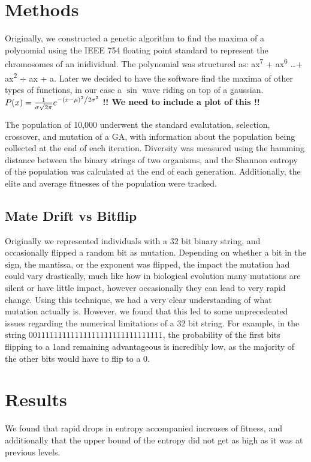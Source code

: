 \documentclass[11pt]{article}
\begin{document}
\section{Methods}
\label{sec:org2c55902}
Originally, we constructed a genetic algorithm to find the maxima of a
polynomial using the IEEE 754 floating point standard to represent the
chromosomes of an inidividual. The polynomial was structured as: ax\textsuperscript{7}
+ ax\textsuperscript{6} \ldots + ax\textsuperscript{2} + ax + a. Later we
decided to have the software find the maxima of other types of functions,
in our case a $\sin$ wave riding on top of a gaussian. $ P(x) = \frac{1}{{\sigma \sqrt {2\pi } }} e^{{{ - \left( {x - \mu} \right)^2 } \mathord{\left/ {\vphantom {{ - \left( {x - \mu } \right)^2 } {2\sigma ^2 }}} \right. \kern-\nulldelimiterspace} {2\sigma ^2 }}} $
\color{red} \textbf{!! We need to include a plot of this !!}
\color{black}

The population of 10,000 underwent the standard evalutation, selection,
crossover, and mutation of a  GA, with information about the population
being collected at the end of each iteration. Diversity was measured using
the hamming distance between the binary strings of two organisms, and the
Shannon entropy of the population was calculated at the end of each generation.
Additionally, the elite and average fitnesses of the population were tracked.

\subsection{Mate Drift vs Bitflip}
Originally we represented individuals with a 32 bit binary string, and occasionally 
flipped a random bit as mutation. Depending on whether a bit in the sign, the mantissa, 
or the exponent was flipped, the impact the mutation had could vary drastically,
much like how in biological evolution many mutations are silent or have little impact,
 however occasionally  they can lead to very rapid change. Using this technique,
 we had a very clear understanding of what mutation actually is. However, we found 
that this led to some unprecedented issues regarding the numerical limitations
of a 32 bit string. For example, in the string $0 01111111 11111111111111111111111$,
the probability of the first bits flipping to a 1and remaining advantageous is incredibly
low, as the majority of the other bits would have to flip to a 0.

\section{Results}
\label{sec:orged0917a}
We found that rapid drops in entropy accompanied increases of fitness, and
additionally that the upper bound of the entropy did not get as high
as it was at previous levels.
\end{document}
